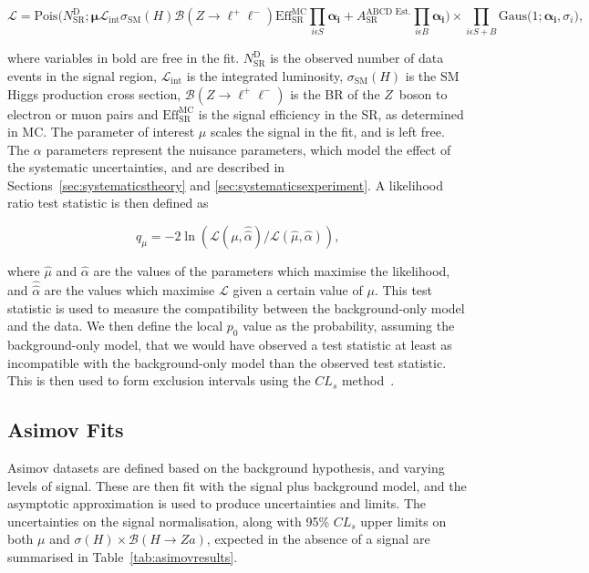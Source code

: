 \documentclass[NOTE, atlasdraft=true, texlive=2017, UKenglish]{\ATLASLATEXPATH atlasdoc}
\begin{document}
$$\mathcal{L}=\text{Pois} \bigg(N^\text{D}_\text{SR}; \bm{\mu} \mathcal{L}_\text{int} \sigma_\text{SM}(H) \mathcal{B}(Z\to\ell^+\ell^-) \text{Eff}^\text{MC}_\text{SR} \prod_{i \epsilon S} \bm{\alpha_i} + A^\text{ABCD Est.}_\text{SR} \prod_{i \epsilon B} \bm{\alpha_i} \bigg) \times \prod_{i \epsilon S+B} \text{Gaus} \bigg(1; \bm{\alpha_i}, \sigma_i\bigg) \text{,}$$

where variables in bold are free in the fit. $N^\text{D}_\text{SR}$ is the observed number of data events in the signal region, $\mathcal{L}_\text{int}$ is the integrated luminosity, $\sigma_\text{SM}(H)$ is the SM Higgs production cross section, $\mathcal{B}(Z\to\ell^+\ell^-)$ is the BR of the $Z$~boson to electron or muon pairs and $\text{Eff}^\text{MC}_\text{SR}$ is the signal efficiency in the SR, as determined in MC. The parameter of interest $\mu$ scales the signal in the fit, and is left free. The $\alpha$ parameters represent the nuisance parameters, which model the effect of the systematic uncertainties, and are described in Sections~\ref{sec:systematicstheory} and \ref{sec:systematicsexperiment}. A likelihood ratio test statistic is then defined as

$$q_\mu = -2\ln(\mathcal{L}(\mu, \hat{\hat{\alpha}})/\mathcal{L}(\hat{\mu}, \hat{\alpha}))\text{,}$$

where $\hat{\mu}$ and $\hat{\alpha}$ are the values of the parameters which maximise the likelihood, and $\hat{\hat{\alpha}}$ are the values which maximise $\mathcal{L}$ given a certain value of $\mu$. This test statistic is used to measure the compatibility between the background-only model and the data. We then define the local $p_0$ value as the probability, assuming the background-only model, that we would have observed a test statistic at least as incompatible with the background-only model than the observed test statistic. This is then used to form exclusion intervals using the $CL_s$ method~\cite{Cowan:2010js,Read_2002}.


\subsection{Asimov Fits}
\label{sec:asimovfits}

Asimov datasets are defined based on the background hypothesis, and varying levels of signal. These are then fit with the signal plus background model, and the asymptotic approximation is used to produce uncertainties and limits. The uncertainties on the signal normalisation, along with 95\% $CL_s$ upper limits on both $\mu$ and $\sigma(H)\times \mathcal{B}(H\to Za)$, expected in the absence of a signal are summarised in Table~\ref{tab:asimovresults}.%
\end{document}

